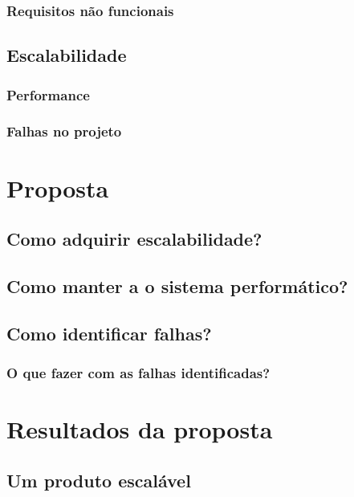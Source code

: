 \documentclass[]{../class/politex}
\begin{document}
      \subsection{Requisitos não funcionais}

    \section{Escalabilidade}

      \subsection{Performance}

      \subsection{Falhas no projeto}

  \chapter{Proposta}

    \section{Como adquirir escalabilidade?}

    \section{Como manter a o sistema performático?}

    \section{Como identificar falhas?}

      \subsection{O que fazer com as falhas identificadas?}

  \chapter{Resultados da proposta}

    \section{Um produto escalável}
\end{document}
